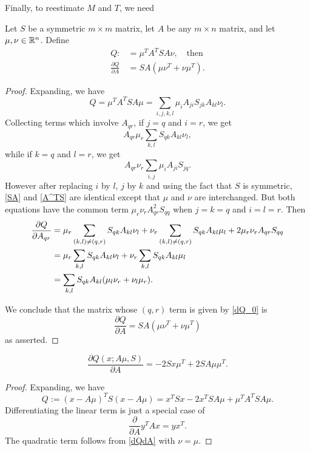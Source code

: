 \documentclass[12pt,leqno]{article}
\begin{document}
Finally, to reestimate $M$ and $T$, we need

\begin{Lem}\label{dQdA}
  Let $S$ be a symmetric $m\times{m}$ matrix, let $A$ be any $m\times{n}$ matrix,
  and let $\mu,\nu\in {\mathbb R}^n$.  Define
  \begin{align*}
  Q :&= \mu^TA^TSA\nu,\quad\text{then}\\
  \frac{\partial{Q}}{\partial{A}} &= SA(\mu\nu^T+\nu\mu^T).
  \end{align*}
\end{Lem}
\begin{proof}
Expanding, we have
$$
Q = \mu^TA^TSA\mu = \sum_{i,j,k,l}\mu_iA_{ji}S_{jk}A_{kl}\nu_l.
$$
Collecting terms which involve $A_{qr}$, if $j=q$ and $i=r$, we get
\begin{equation}\label{SA}
A_{qr}\mu_r\sum_{k,l}S_{qk}A_{kl}\nu_l,
\end{equation}
while if $k=q$ and $l=r$, we get
\begin{equation}\label{A^TS}
A_{qr}\nu_r\sum_{i,j}\mu_iA_{ji}S_{jq}.
\end{equation}
However after replacing $i$ by $l$, $j$ by $k$ and using the fact that $S$ is symmetric,
\eqref{SA} and \eqref{A^TS} are identical except that $\mu$ and $\nu$ are interchanged.
But both equations have the common term
$\mu_r\nu_rA_{qr}^2S_{qq}$ when $j = k = q$ and $i = l = r$.
Then
\begin{align}
  \notag\frac{\partial{Q}}{\partial{A_{qr}}} &= \mu_r\sum_{(k,l)\neq(q,r)}S_{qk}A_{kl}\nu_l
  +\nu_r\sum_{(k,l)\neq(q,r)}S_{qk}A_{kl}\mu_l+ 2\mu_r\nu_rA_{qr}S_{qq}\\
  &= \mu_r\sum_{k,l}S_{qk}A_{kl}\nu_l + \nu_r\sum_{k,l}S_{qk}A_{kl}\mu_l\notag\\
  &= \sum_{k,l}S_{qk}A_{kl}(\mu_l\nu_r + \nu_l\mu_r).\label{dQ_0}
\end{align}

We conclude that the matrix whose $(q,r)$ term is given by \eqref{dQ_0} is
$$
\frac{\partial{Q}}{\partial{A}} = SA(\mu\nu^T+\nu\mu^T)
$$
as asserted.
\end{proof}

\begin{Cor}\label{dM}
  $$
  \frac{\partial{Q(x;A\mu,S)}}{\partial{A}} = -2Sx\mu^T + 2SA\mu\mu^T.
  $$
\end{Cor}
\begin{proof}
Expanding, we have
$$
Q := (x-A\mu)^TS(x-A\mu) = x^TSx - 2x^TSA\mu + \mu^TA^TSA\mu.
$$
Differentiating the linear term is just a special case of
$$
\frac{\partial}{\partial{A}}y^TAx = yx^T.
$$
The quadratic term follows from \eqref{dQdA} with $\nu = \mu$.
\end{proof}
\end{document}
